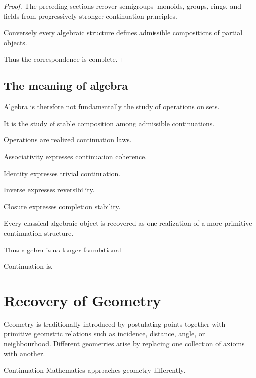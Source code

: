 \documentclass[13pt,openany]{book}
\theoremstyle{plain}
\theoremstyle{definition}
\begin{document}
\begin{proof}

The preceding sections recover semigroups, monoids, groups, rings, and fields from progressively stronger continuation principles.

Conversely every algebraic structure defines admissible compositions of partial objects.

Thus the correspondence is complete.

\end{proof}

\section{The meaning of algebra}

Algebra is therefore not fundamentally the study of operations on sets.

It is the study of stable composition among admissible continuations.

Operations are realized continuation laws.

Associativity expresses continuation coherence.

Identity expresses trivial continuation.

Inverse expresses reversibility.

Closure expresses completion stability.

Every classical algebraic object is recovered as one realization of a more primitive continuation structure.

Thus algebra is no longer foundational.

Continuation is.

\chapter{Recovery of Geometry}

Geometry is traditionally introduced by postulating points together with
primitive geometric relations such as incidence, distance, angle, or
neighbourhood. Different geometries arise by replacing one collection of
axioms with another.

Continuation Mathematics approaches geometry differently.
\end{document}
